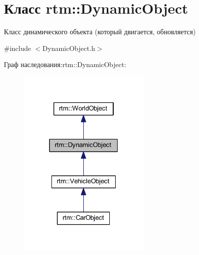 \hypertarget{classrtm_1_1_dynamic_object}{}\section{Класс rtm\+:\+:Dynamic\+Object}
\label{classrtm_1_1_dynamic_object}


Класс динамического объекта (который двигается, обновляется)  




{\ttfamily \#include $<$Dynamic\+Object.\+h$>$}



Граф наследования\+:rtm\+:\+:Dynamic\+Object\+:
\nopagebreak
\begin{figure}[H]
\begin{center}
\leavevmode
\includegraphics[width=184pt]{classrtm_1_1_dynamic_object__inherit__graph}
\end{center}
\end{figure}
